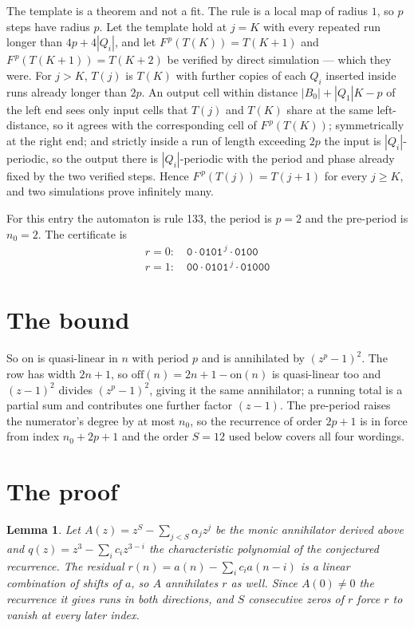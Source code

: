 \documentclass[11pt,a4paper]{article}
\theoremstyle{plain}
\newtheorem{lemma}[theorem]{Lemma}
\theoremstyle{definition}
\begin{document}
The template is a theorem and not a fit. The rule is a local map of radius $1$, so $p$ steps
have radius $p$. Let the template hold at $j=K$ with every repeated run longer than
$4p+4|Q_i|$, and let $F^{\,p}(T(K))=T(K+1)$ and $F^{\,p}(T(K+1))=T(K+2)$ be verified by direct
simulation --- which they were. For $j>K$, $T(j)$ is $T(K)$ with further copies of each $Q_i$
inserted inside runs already longer than $2p$. An output cell within distance
$|B_0|+|Q_1|K-p$ of the left end sees only input cells that $T(j)$ and $T(K)$ share at the same
left-distance, so it agrees with the corresponding cell of $F^{\,p}(T(K))$; symmetrically at
the right end; and strictly inside a run of length exceeding $2p$ the input is
$|Q_i|$-periodic, so the output there is $|Q_i|$-periodic with the period and phase already
fixed by the two verified steps. Hence $F^{\,p}(T(j))=T(j+1)$ for every $j\ge K$, and two
simulations prove infinitely many.

For this entry the automaton is rule 133, the period is $p=2$ and the pre-period is $n_0=2$.
The certificate is
\begin{gather*}
r=0:\quad \texttt{0} \cdot \texttt{0101}^{\,j} \cdot \texttt{0100} \\
r=1:\quad \texttt{00} \cdot \texttt{0101}^{\,j} \cdot \texttt{01000}
\end{gather*}

\section{The bound}

So $\mathrm{on}$ is quasi-linear in $n$ with period $p$ and is annihilated by
$(z^p-1)^2$. The row has width $2n+1$, so $\mathrm{off}(n)=2n+1-\mathrm{on}(n)$ is quasi-linear
too and $(z-1)^2$ divides $(z^p-1)^2$, giving it the same annihilator; a running total is a
partial sum and contributes one further factor $(z-1)$. The pre-period raises the numerator's
degree by at most $n_0$, so the recurrence of order $2p+1$ is in force from index $n_0+2p+1$
and the order $S=12$ used below covers all four wordings.

\section{The proof}

\begin{lemma}\label{lem:crit}
Let $A(z)=z^S-\sum_{j<S}\alpha_jz^{j}$ be the monic annihilator derived above and
$q(z)=z^{3}-\sum_ic_iz^{3-i}$ the characteristic polynomial of the conjectured
recurrence. The residual $r(n)=a(n)-\sum_ic_ia(n-i)$ is a linear combination of shifts of $a$,
so $A$ annihilates $r$ as well. Since $A(0)\ne0$ the recurrence it gives runs in both
directions, and $S$ consecutive zeros of $r$ force $r$ to vanish at every later index.
\end{lemma}
\end{document}
